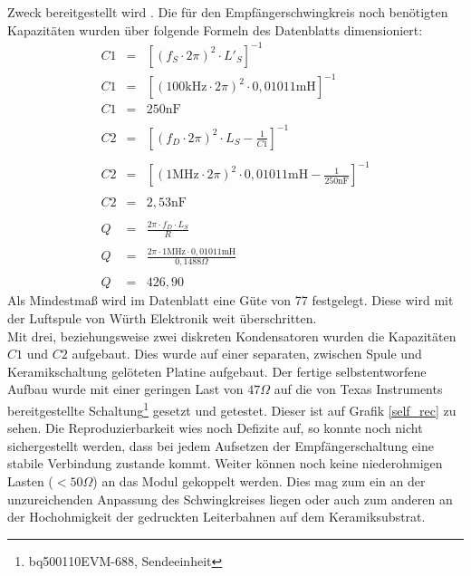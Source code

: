 \documentclass[12pt]{scrreprt} %
\begin{document}
Zweck bereitgestellt wird \citep{Spule}. Die für den Empfängerschwingkreis noch benötigten Kapazitäten wurden über folgende Formeln des Datenblatts \citep{BQ51013} dimensioniert: 
\begin{eqnarray}
C1&=&\left[\left(f_S \cdot 2\pi\right)^2 \cdot L'_S\right]^{-1}\\
C1&=&\left[\left(100\text{kHz} \cdot 2\pi\right)^2 \cdot 0,01011\text{mH}\right]^{-1}\\
C1&=&250\text{nF}\\
\nonumber\\
C2&=&\left[\left(f_D \cdot 2\pi\right)^2 \cdot L_S-\frac 1{C1}\right]^{-1}\\
\nonumber\\
C2&=&\left[\left(1\text{MHz} \cdot 2\pi\right)^2 \cdot 0,01011\text{mH}-\frac 1{250\text{nF}}\right]^{-1}\\
\nonumber\\
C2&=&2,53\text{nF}\\
\nonumber\\
Q&=&\frac{2\pi \cdot f_D \cdot L_S}{R}\\
\nonumber\\
Q&=&\frac{2\pi \cdot 1\text{MHz} \cdot 0,01011\text{mH}}{0,1488 \Omega}\\
\nonumber\\
Q&=&426,90
\end{eqnarray}
Als Mindestmaß wird im Datenblatt \citep[siehe S.23]{BQ51013} eine Güte von 77 festgelegt. Diese wird mit der Luftspule von Würth Elektronik weit überschritten.\\
Mit drei, beziehungsweise zwei diskreten Kondensatoren wurden die Kapazitäten $C1$ und $C2$ aufgebaut. Dies wurde auf einer separaten, zwischen Spule und Keramikschaltung gelöteten Platine aufgebaut. Der fertige selbstentworfene Aufbau wurde mit einer geringen Last von $47 \Omega$ auf die von Texas Instruments bereitgestellte Schaltung\footnote{bq500110EVM-688, Sendeeinheit} gesetzt und getestet. Dieser ist auf Grafik \vref{self_rec} zu sehen. Die Reproduzierbarkeit wies noch Defizite auf, so konnte noch nicht sichergestellt werden, dass bei jedem Aufsetzen der Empfängerschaltung eine stabile Verbindung zustande kommt. Weiter können noch keine niederohmigen Lasten ($<50 \Omega$) an das Modul gekoppelt werden. Dies mag zum ein an der unzureichenden Anpassung des Schwingkreises liegen oder auch zum anderen an der Hochohmigkeit der gedruckten Leiterbahnen auf dem Keramiksubstrat. 
\end{document}
